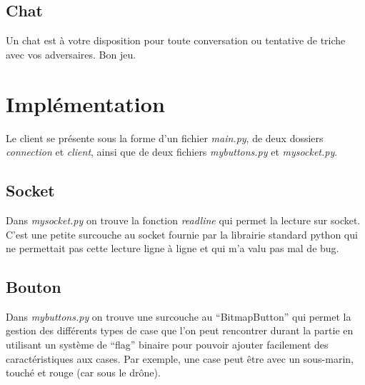 \documentclass[a4paper, 11pt]{report}
\begin{document}
\subsection{Chat}
Un chat est à votre disposition pour toute conversation ou tentative de triche avec vos adversaires.
\newline
\newline
Bon jeu.

\section{Implémentation}

Le client se présente sous la forme d'un fichier \emph{main.py}, de deux dossiers 
\emph{connection} et \emph{client}, ainsi que de deux fichiers
\emph{mybuttons.py} et \emph{mysocket.py}.

\subsection{Socket}
Dans \emph{mysocket.py} on trouve la fonction \emph{readline} 
qui permet la lecture sur socket. C'est une petite surcouche au socket fournie par la librairie standard python qui ne permettait pas cette 
lecture ligne à ligne et qui m'a valu pas mal de bug.

\subsection{Bouton}
Dans \emph{mybuttons.py} on trouve une surcouche au ``BitmapButton'' qui permet la gestion des différents types de 
case que l'on peut rencontrer durant la partie en utilisant un système de ``flag'' binaire pour pouvoir ajouter facilement des caractéristiques aux cases.
Par exemple, une case peut être avec un sous-marin, touché et rouge (car sous le drône).
\end{document}
